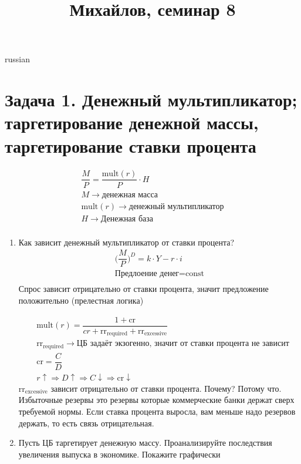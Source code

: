 \documentclass{article}
\begin{document}
\title{\foreignlanguage{russian}{Михайлов, семинар 8}}
\maketitle
\begin{otherlanguage*}{russian}
\section*{Задача 1. Денежный мультипликатор; таргетирование денежной массы,
таргетирование ставки процента}
\begin{align*}
\dfrac{M}{P} = \dfrac{\text{mult}(r)}{P} \cdot H \\
M \rightarrow \text{денежная масса} \\
\text{mult} (r) \rightarrow \text{денежный мультипликатор} \\
H \rightarrow \text{Денежная база} \\
\end{align*}
\begin{enumerate}
\item Как зависит денежный мультипликатор от ставки процента? 
\begin{align*}
\Big( \dfrac{M}{P} \Big) ^ D = k \cdot Y - r \cdot i  \\
\text{Предлоение денег} = \text{const} \\
\end{align*}
Спрос зависит отрицательно от ставки процента, значит предложение положительно (прелестная логика) 

\begin{align*}
&\text{mult} (r) = \dfrac{1 + \text{cr}}{cr + \text{rr}_{\text{required}} + \text{rr}_{\text{excessive}}} \\
&\text{rr}_{\text{required}} \rightarrow \text{ЦБ задаёт экзогенно, значит от ставки процента не зависит} \\
& \text{cr} = \dfrac{C}{D} \\
& r \uparrow \Rightarrow D \uparrow \Rightarrow C \downarrow \Rightarrow \text{cr} \downarrow 
\end{align*}
$ \text{rr}_{\text{excessive}} $ зависит отрицательно от ставки процента. Почему? Потому что. Избыточные резервы это резервы которые коммерческие банки держат сверх требуемой нормы. Если ставка процента выросла, вам меньше надо резервов держать, то есть связь отрицательная.
\item Пусть ЦБ таргетирует денежную массу. Проанализируйте последствия увеличения
выпуска в экономике. Покажите графически


\end{enumerate}
\end{otherlanguage*}
\end{document}
